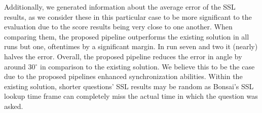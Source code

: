 Additionally, we generated information about the average error of the SSL results, as we consider these in this particular case to be more significant to the evaluation due to the score results being very close to one another.
When comparing them, the proposed pipeline outperforms the existing solution in all runs but one, oftentimes by a significant margin.
In run seven and two it (nearly) halves the error.
Overall, the proposed pipeline reduces the error in angle by around 30$^\circ$ in comparison to the existing solution.
We believe this to be the case due to the proposed pipelines enhanced synchronization abilities.
Within the existing solution, shorter questions' SSL results may be random as Bonsai's SSL lookup time frame can completely miss the actual time in which the question was asked.















